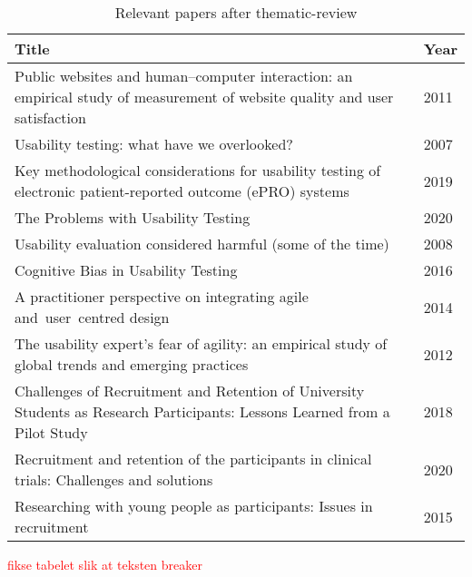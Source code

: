 \begin{table}[H]
\centering
\begin{tabular}{p{0.9125\linewidth}p{0.0875\linewidth}}
\hline
\textbf{Title} & \textbf{Year} \\ \hline
Public websites and human–computer interaction: an empirical study of measurement of website quality and user satisfaction & 2011 \\
Usability testing: what have we overlooked? & 2007 \\
Key methodological considerations for usability testing of electronic patient-reported outcome (ePRO) systems & 2019 \\
The Problems with Usability Testing & 2020 \\
Usability evaluation considered harmful (some of the time) & 2008 \\
Cognitive Bias in Usability Testing & 2016 \\
A practitioner perspective on integrating agile and user centred design & 2014 \\
The usability expert's fear of agility: an empirical study of global trends and emerging practices & 2012 \\
Challenges of Recruitment and Retention of University Students as Research Participants: Lessons Learned from a Pilot Study & 2018 \\
Recruitment and retention of the participants in clinical trials: Challenges and solutions & 2020 \\
Researching with young people as participants: Issues in recruitment & 2015 \\ \hline
\end{tabular}
\caption{Relevant papers after thematic-review}
\label{tab:relevant-papers}
\end{table}

\textcolor{red}{fikse tabelet slik at teksten breaker}


